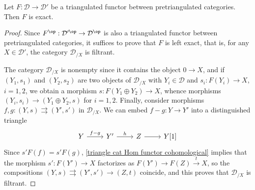 \begin{proposition}\label{triangle cat triangulated functor exact}
Let $F:\mathcal{D}\to\mathcal{D}'$ be a triangulated functor between pretriangulated categories. Then $F$ is exact.
\end{proposition}
\begin{proof}
Since $F^{\op}:\mathcal{D}'^{\op}\to\mathcal{D}^{\op}$ is also a triangulated functor between pretriangulated categories, it suffices to prove that $F$ is left exact, that is, for any $X\in\mathcal{D}'$, the category $\mathcal{D}_{/X}$ is filtrant.\par
The category $\mathcal{D}_{/X}$ is nonempty since it contains the object $0\to X$, and if $(Y_1,s_1)$ and $(Y_2,s_2)$ are two objects of $\mathcal{D}_{/X}$ with $Y_i\in\mathcal{D}$ and $s_i:F(Y_i)\to X$, $i=1,2$, we obtain a morphism $s:F(Y_1\oplus Y_2)\to X$, whence morphisms $(Y_i,s_i)\to (Y_1\oplus Y_2,s)$ for $i=1,2$. Finally, consider morphisms $f,g:(Y,s)\rightrightarrows (Y',s')$ in $\mathcal{D}_{/X}$. We can embed $f-g:Y\to Y'$ into a distinguished triangle
\[\begin{tikzcd}
Y\ar[r,"f-g"]&Y'\ar[r,"h"]&Z\ar[r]&Y[1]
\end{tikzcd}\]
Since $s'F(f)=s'F(g)$, \cref{triangle cat Hom functor cohomological} implies that the morphism $s':F(Y')\to X$ factorizes as $F(Y')\to F(Z)\stackrel{t}{\to} X$, so the compositions $(Y,s)\rightrightarrows (Y',s')\to (Z,t)$ coincide, and this proves that $\mathcal{D}_{/X}$ is filtrant. 
\end{proof}

